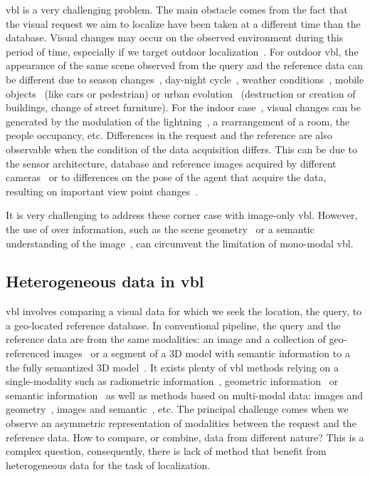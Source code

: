 	\Ac{vbl} is a very challenging problem. The main obstacle comes from the fact that the visual request we aim to localize have been taken at a different time than the database. Visual changes may occur on the observed environment during this period of time, especially if we target outdoor localization~\citep{Lowry2016, Sattler2017a}. For outdoor \ac{vbl}, the appearance of the same scene observed from the query and the reference data can be different due to season changes~\citep{Krajnik2017a}, day-night cycle~\citep{Porav2018}, weather conditions~\citep{Porav2019}, mobile objects~\citep{Toft2018} (like cars or pedestrian) or urban evolution~\citep{Saha2018} (\eg destruction or creation of buildings, change of street furniture). For the indoor case~\citep{Taira2018}, visual changes can be generated by the modulation of the lightning~\citep{Lu2016}, a rearrangement of a room, the people occupancy, etc. Differences in the request and the reference are also observable when the condition of the data acquisition differs. This can be due to the sensor architecture, \eg database and reference images acquired by different cameras~\citep{Middelberg2014, Majdik2013} or to differences on the pose of the agent that acquire the data, resulting on important view point changes~\citep{Majdik2013, Torii2011, Lin2013, Vo2016, Tian2017}.
	
	It is very challenging to address these corner case with image-only \ac{vbl}. However, the use of over information, such as the scene geometry~\citep{Uy2018, Yew2018} or a semantic understanding of the image~\citep{Weinzaepfel2019}, can circumvent the limitation of mono-modal \ac{vbl}.
		
\subsection{Heterogeneous data in \acs{vbl}}
	\Ac{vbl} involves comparing a visual data for which we seek the location, the query, to a geo-located reference database. In conventional pipeline, the query and the reference data are from the same modalities: \eg an image and a collection of geo-referenced images~\citep{Arandjelovic2014, Arandjelovic2017} or a segment of a 3D model with semantic information to a the fully semantized 3D model~\citep{Schonberger2017a}. It exists plenty of \ac{vbl} methods relying on a single-modality such as radiometric information~\citep{Liu2018, Radenovic2017}, geometric information~\citep{Uy2018, Yew2018} or semantic information~\citep{Ardeshir2014} as well as methods based on multi-modal data: images and geometry~\citep{Schonberger2017a}, images and semantic~\citep{Arandjelovic2014a}, etc. The principal challenge comes when we observe an asymmetric representation of modalities between the request and the reference data. How to compare, or combine, data from different nature? This is a complex question, consequently, there is lack of method that benefit from heterogeneous data for the task of localization.

